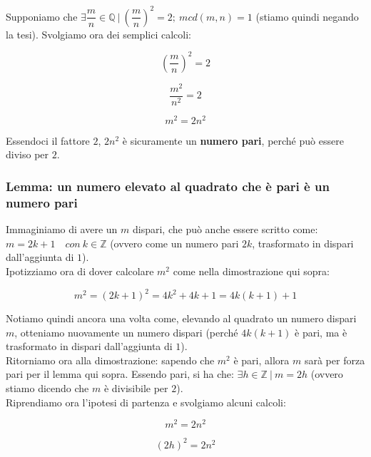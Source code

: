 \documentclass{article}
\begin{document}
\noindent Supponiamo che $\exists \dfrac{m}{n} \in \mathbb{Q} \ | \ \left(\dfrac{m}{n}\right)^2 = 2; \ mcd(m,n) = 1$ (stiamo quindi negando la tesi). Svolgiamo ora dei semplici calcoli:

\begin{equation*}
    \left(\dfrac{m}{n}\right)^2 = 2
\end{equation*}

\begin{equation*}
    \dfrac{m^2}{n^2} = 2
\end{equation*}

\begin{equation*}
    m^2= 2n^2
\end{equation*}

\noindent Essendoci il fattore $2$, $2n^2$ è sicuramente un \textbf{numero pari}, perché può essere diviso per $2$.

\subsubsection{Lemma: un numero elevato al quadrato che è pari è un numero pari}
Immaginiamo di avere un $m$ dispari, che può anche essere scritto come: $m = 2k + 1 \quad con \ k \in \mathbb{Z}$ (ovvero come un numero pari $2k$, trasformato in dispari dall'aggiunta di $1$).\\
Ipotizziamo ora di dover calcolare $m^2$ come nella dimostrazione qui sopra:

\begin{equation*}
    m^2 = (2k + 1)^2 = 4k^2 + 4k + 1 = 4k(k + 1) + 1
\end{equation*}

\noindent Notiamo quindi ancora una volta come, elevando al quadrato un numero dispari $m$, otteniamo nuovamente un numero dispari (perché $4k(k+1)$ è pari, ma è trasformato in dispari dall'aggiunta di $1$).\\

\noindent Ritorniamo ora alla dimostrazione: sapendo che $m^2$ è pari, allora $m$ sarà per forza pari per il lemma qui sopra. Essendo pari, si ha che: $\exists h \in \mathbb{Z} \ | \ m = 2h$ (ovvero stiamo dicendo che $m$ è divisibile per $2$). \\
Riprendiamo ora l'ipotesi di partenza e svolgiamo alcuni calcoli:

\begin{equation*}
    m^2 = 2n^2
\end{equation*}

\begin{equation*}
    (2h)^2 = 2n^2
\end{equation*}
\end{document}
